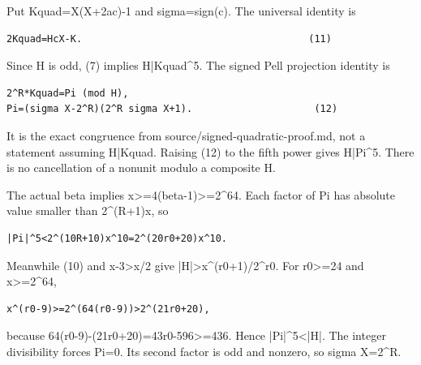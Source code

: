 Put Kquad=\allowbreak{}X(X+\allowbreak{}2ac)-1 and sigma=\allowbreak{}sign(c). The universal identity is



\begin{verbatim}
2Kquad=HcX-K.                                       (11)
\end{verbatim}

Since H is odd, (7) implies H|Kquad\textasciicircum{}\allowbreak{}5. The signed Pell projection identity is



\begin{verbatim}
2^R*Kquad=Pi (mod H),
Pi=(sigma X-2^R)(2^R sigma X+1).                     (12)
\end{verbatim}

It is the exact congruence from source/\allowbreak{}signed-quadratic-proof.md, not a statement assuming H|Kquad. Raising (12) to the fifth power gives H|Pi\textasciicircum{}\allowbreak{}5. There is no cancellation of a nonunit modulo a composite H.



The actual beta implies x\textgreater{}\allowbreak{}=\allowbreak{}4(beta-1)\textgreater{}\allowbreak{}=\allowbreak{}2\textasciicircum{}\allowbreak{}64. Each factor of Pi has absolute value smaller than 2\textasciicircum{}\allowbreak{}(R+\allowbreak{}1)x, so



\begin{verbatim}
|Pi|^5<2^(10R+10)x^10=2^(20r0+20)x^10.
\end{verbatim}

Meanwhile (10) and x-3\textgreater{}\allowbreak{}x/\allowbreak{}2 give |H|\textgreater{}\allowbreak{}x\textasciicircum{}\allowbreak{}(r0+\allowbreak{}1)/\allowbreak{}2\textasciicircum{}\allowbreak{}r0. For r0\textgreater{}\allowbreak{}=\allowbreak{}24 and x\textgreater{}\allowbreak{}=\allowbreak{}2\textasciicircum{}\allowbreak{}64,



\begin{verbatim}
x^(r0-9)>=2^(64(r0-9))>2^(21r0+20),
\end{verbatim}

because 64(r0-9)-(21r0+\allowbreak{}20)=\allowbreak{}43r0-596\textgreater{}\allowbreak{}=\allowbreak{}436. Hence |Pi|\textasciicircum{}\allowbreak{}5\textless{}\allowbreak{}|H|. The integer divisibility forces Pi=\allowbreak{}0. Its second factor is odd and nonzero, so sigma X=\allowbreak{}2\textasciicircum{}\allowbreak{}R.



